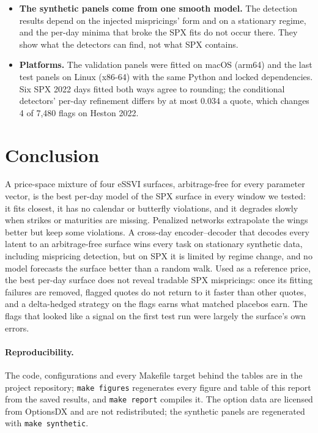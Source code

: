 \begin{itemize}
  \item \textbf{The synthetic panels come from one smooth model.} The detection results depend on
  the injected mispricings' form and on a stationary regime, and the per-day minima that broke the
  SPX fits do not occur there. They show what the detectors can find, not what SPX contains.
  \item \textbf{Platforms.} The validation panels were fitted on macOS (arm64) and the last test
  panels on Linux (x86-64) with the same Python and locked dependencies. Six SPX 2022 days fitted
  both ways agree to rounding; the conditional detectors' per-day refinement differs by at most
  0.034\vp{} a quote, which changes 4 of 7{,}480 flags on Heston 2022.
\end{itemize}

\section{Conclusion}
\label{sec:conclusion}

A price-space mixture of four eSSVI surfaces, arbitrage-free for every parameter vector, is the best
per-day model of the SPX surface in every window we tested: it fits closest, it has no calendar or
butterfly violations, and it degrades slowly when strikes or maturities are missing. Penalized
networks extrapolate the wings better but keep some violations. A cross-day encoder--decoder that
decodes every latent to an arbitrage-free surface wins every task on stationary synthetic data,
including mispricing detection, but on SPX it is limited by regime change, and no model forecasts
the surface better than a random walk. Used as a reference price, the best per-day surface does not
reveal tradable SPX mispricings: once its fitting failures are removed, flagged quotes do not return
to it faster than other quotes, and a delta-hedged strategy on the flags earns what matched placebos
earn. The flags that looked like a signal on the first test run were largely the surface's own
errors.

\paragraph{Reproducibility.} The code, configurations and every Makefile target behind the tables
are in the project repository; \texttt{make figures} regenerates every figure and table of this
report from the saved results, and \texttt{make report} compiles it. The option data are licensed
from OptionsDX and are not redistributed; the synthetic panels are regenerated with
\texttt{make synthetic}.

